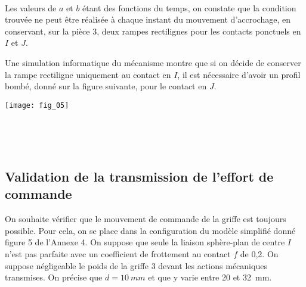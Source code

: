 \ifprof
\begin{corrige}~\\
\end{corrige}
\else
\fi

Les valeurs de $a$ et $b$ étant des fonctions du temps, on constate que la condition trouvée ne peut être réalisée
à chaque instant du mouvement d'accrochage, en conservant, sur la pièce 3, deux rampes rectilignes pour les
contacts ponctuels en $I$ et $J$.

Une simulation informatique du mécanisme montre que si on décide de conserver la rampe rectiligne
uniquement au contact en $I$, il est nécessaire d'avoir un profil bombé, donné sur la figure suivante, pour
le contact en $J$.

\begin{marginfigure}
\texttt{[image: fig\_05]}
\end{marginfigure}

\ifprof
\begin{corrige}~\\
\end{corrige}
\else
\fi



\ifprof
\begin{corrige}~\\
\end{corrige}
\else
\fi


\subsection*{Validation de la transmission de l'effort de commande}


On souhaite vérifier que le mouvement de commande de la griffe est toujours possible. Pour cela, on se
place dans la configuration du modèle simplifié donné figure 5 de l'Annexe 4. On suppose que seule la liaison
sphère-plan de centre $I$ n'est pas parfaite avec un coefficient de frottement au contact $f$ de 0,2. On suppose
négligeable le poids de la griffe 3 devant les actions mécaniques transmises. On précise que $d=\SI{10}{mm}$ et que
y varie entre 20 et \SI{32}{mm}.

